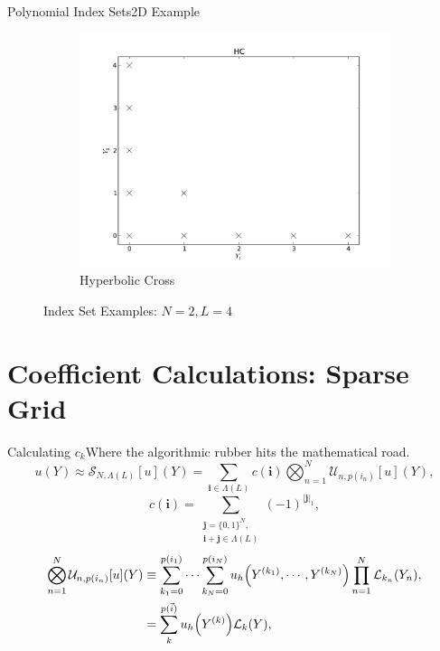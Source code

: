 \documentclass{beamer}
\begin{document}
\begin{frame}{Polynomial Index Sets}{2D Example}
\begin{figure}[H]
\begin{subfigure}[b]{0.32 \textwidth}
   \includegraphics[width=\textwidth]{../graphics/HC}
   \caption{Hyperbolic Cross}
   \label{HC}
  \end{subfigure}
  \caption{Index Set Examples: $N=2,L=4$}
  \label{indexsets}
\end{figure}
\end{frame}

\section{Coefficient Calculations: Sparse Grid}
\begin{frame}{Calculating $c_k$}{Where the algorithmic rubber hits the mathematical road.}
\normalsize\vspace{-20pt}
\begin{equation*}
u(Y)\approx\mathcal{S}_{N,\Lambda(L)}[u](Y)=\sum_{\boldsymbol{i}\in\Lambda(L)}c(\boldsymbol{i})\bigotimes_{n=1}^N\mathcal{U}_{n,p(i_n)}[u](Y),
\end{equation*}
\begin{equation*}
c(\boldsymbol{i})=\sum_{\substack{\boldsymbol{j}=\{0,1\}^N,\\ \boldsymbol{i}+\boldsymbol{j}\in\Lambda(L)}}(-1)^{|\boldsymbol{j}|_1},
\end{equation*}
\begin{align*}
\bigotimes_{n=1}^N\mathcal{U}_{n,p(i_n)}[u](Y)&\equiv\sum_{k_1=0}^{p(i_1)}\cdots\sum_{k_N=0}^{p(i_N)}u_h\qty(Y^{(k_1)},\cdots,Y^{(k_N)})\prod_{n=1}^N \mathcal{L}_{k_n}(Y_n),\\
  &=\sum_{k}^{p(\vec i)}u_h\qty(Y^{(k)})\mathcal{L}_k(Y),
\end{align*}
\end{frame}
\end{document}
